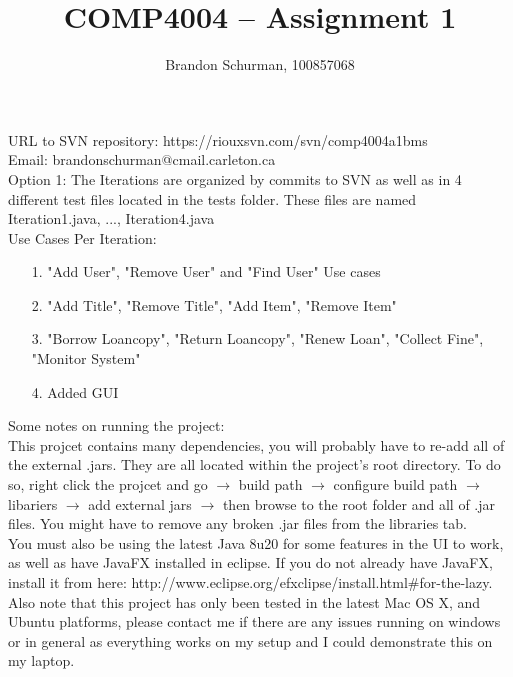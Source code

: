 \documentclass[12pt]{article}
\newenvironment{code}{ 
    \ttfamily
}{\vspace{5mm}}
\begin{document}
\title{COMP4004 -- Assignment 1}
\author{Brandon Schurman, 100857068}
\maketitle
\vspace{5mm}
URL to SVN repository: \begin{code}https://riouxsvn.com/svn/comp4004a1bms\end{code}
\vspace{10mm} \\
Email: \begin{code}brandonschurman@cmail.carleton.ca\end{code}
\vspace{10mm} \\
Option 1: The Iterations are organized by commits to SVN as well as in 4 different test files located in the tests folder. These files are named \begin{code}Iteration1.java, ..., Iteration4.java\end{code}
\vspace{5mm} \\
Use Cases Per Iteration:
\begin{itemize}
    \item[1.] "Add User", "Remove User" and "Find User" Use cases
    \item[2.] "Add Title", "Remove Title", "Add Item", "Remove Item"
    \item[3.] "Borrow Loancopy", "Return Loancopy", "Renew Loan", "Collect Fine", "Monitor System"
    \item[4.] Added GUI
\end{itemize}

\vspace{10mm}
Some notes on running the project: \\
This projcet contains many dependencies, you will probably have to re-add all of the external .jars. They are all located within the project's root directory. To do so, right click the projcet and go $\rightarrow$ build path $\rightarrow$ configure build path $\rightarrow$ libariers $\rightarrow$ add external jars $\rightarrow$ then browse to the root folder and all of .jar files. You might have to remove any broken .jar files from the libraries tab. \\
You must also be using the latest Java 8u20 for some features in the UI to work, as well as have JavaFX installed in eclipse. If you do not already have JavaFX, install it from here: \begin{code}http://www.eclipse.org/efxclipse/install.html\#for-the-lazy\end{code}. 
Also note that this project has only been tested in the latest Mac OS X, and Ubuntu platforms, please contact me if there are any issues running on windows or in general as everything works on my setup and I could demonstrate this on my laptop.
\end{document}
